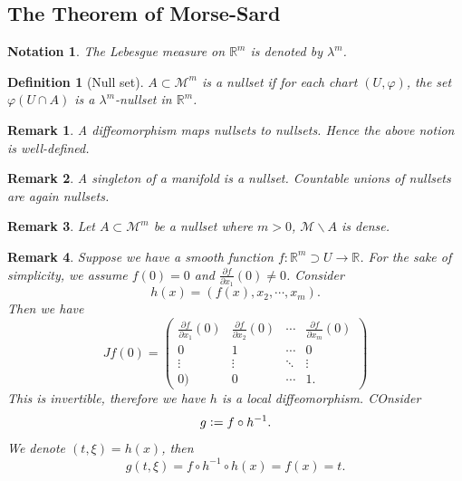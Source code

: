 \documentclass[8pt]{article}
\newtheorem{definition}{Definition}[section]
\newtheorem{notation}{Notation}[section]
\newtheorem{remark}{Remark}[section]
\newcommand{\defeq}{\vcentcolon=}
\newcommand{\R}[0]{\mathbb{R}}
\newcommand{\M}[0]{\mathcal{M}}
\newcommand{\pd}[2]{{\frac {\partial #1} {\partial #2}}}
\begin{document}
\subsection{The Theorem of Morse-Sard}
\begin{notation}
The Lebesgue measure on $\R^m$ is denoted by $\lambda^m$. 
\end{notation}
\begin{definition}[Null set]
  $A\subset \M^m$ is a nullset if for each chart $(U,\varphi)$, the set $\varphi(U\cap A)$ is a $\lambda^m$-nullset in $\R^m$. 
\end{definition}
\begin{remark}
  A diffeomorphism maps nullsets to nullsets. Hence the above notion is well-defined.
\end{remark}
\begin{remark}
  A singleton of a manifold is a nullset. Countable unions of nullsets are again nullsets.
\end{remark}
\begin{remark}
  Let $A\subset\M^m$ be a nullset where $m>0$, $\M\backslash A$ is dense.
\end{remark}
\begin{remark}
  Suppose we have a smooth function $f:\R^m\supset U\to\R$. For the sake of simplicity, we assume $f(0) = 0$ and $\pd{f}{x_1}(0)\not=0$. Consider 
  \begin{equation*}
    h(x) = (f(x),x_2,\cdots,x_m).
  \end{equation*}
  Then we have 
  \begin{equation*}
    Jf(0) = \begin{pmatrix}
      \pd{f}{x_1}(0) & \pd{f}{x_2}(0)&\cdots &\pd{f}{x_m}(0)\\
      0 & 1 & \cdots & 0\\
      \vdots & \vdots & \ddots & \vdots\\
      0) & 0 & \cdots & 1.
    \end{pmatrix}
  \end{equation*}
  This is invertible, therefore we have $h$ is a local diffeomorphism. COnsider 
  \begin{equation*}
    g \defeq f\circ h^{-1}.
  \end{equation*}
  We denote $(t,\xi) = h(x)$, then 
  \begin{equation*}
    g(t,\xi) = f\circ h^{-1}\circ h (x) = f(x) = t.
  \end{equation*}
  \label{local_diffeo_section}
\end{remark}
\end{document}
